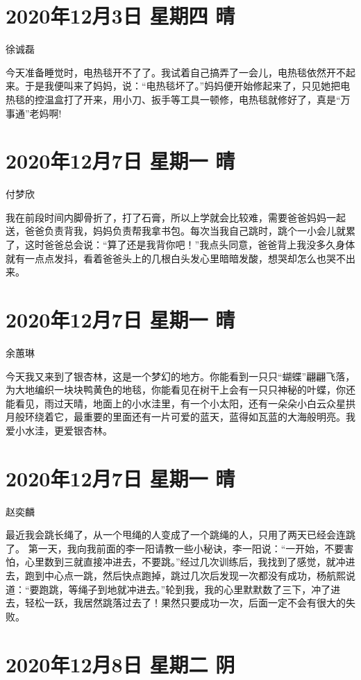 \section{2020年12月3日 星期四 晴}

徐诚磊

今天准备睡觉时，电热毯开不了了。我试着自己搞弄了一会儿，电热毯依然开不起来。于是我便叫来了妈妈，说：“电热毯坏了。”妈妈便开始修起来了，只见她把电热毯的控温盒打了开来，用小刀、扳手等工具一顿修，电热毯就修好了，真是“万事通”老妈啊!

\section{2020年12月7日 星期一 晴}

付梦欣

我在前段时间内脚骨折了，打了石膏，所以上学就会比较难，需要爸爸妈妈一起送，爸爸负责背我，妈妈负责帮我拿书包。每次当我自己跳时，跳个一小会儿就累了，这时爸爸总会说：“算了还是我背你吧！”我点头同意，爸爸背上我没多久身体就有一点点发抖，看着爸爸头上的几根白头发心里暗暗发酸，想哭却怎么也哭不出来。

\section{2020年12月7日 星期一 晴}

余蕙琳

今天我又来到了银杏林，这是一个梦幻的地方。你能看到一只只“蝴蝶”翩翩飞落，为大地编织一块块鸭黄色的地毯，你能看见在树干上会有一只只神秘的叶蝶，你还能看见，雨过天晴，地面上的小水洼里，有一个小太阳，还有一朵朵小白云众星拱月般环绕着它，最重要的里面还有一片可爱的蓝天，蓝得如瓦蓝的大海般明亮。我爱小水洼，更爱银杏林。

\section{2020年12月7日 星期一 晴}

赵奕麟

最近我会跳长绳了，从一个甩绳的人变成了一个跳绳的人，只用了两天已经会连跳了。
第一天，我向我前面的李一阳请教一些小秘诀，李一阳说：“一开始，不要害怕，心里数到三就直接冲进去，不要跳。”经过几次训练后，我找到了感觉，就冲进去，跑到中心点一跳，然后快点跑掉，跳过几次后发现一次都没有成功，杨航熙说道：“要跑跳，等绳子到地就冲进去。”轮到我，我的心里默默数了三下，冲了进去，轻松一跃，我居然跳落过去了！果然只要成功一次，后面一定不会有很大的失败。

\section{2020年12月8日 星期二 阴}


